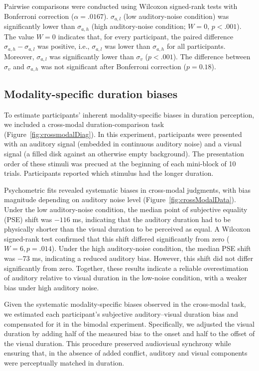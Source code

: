 \documentclass{biorxiv}
\begin{document}
Pairwise comparisons were conducted using Wilcoxon signed-rank tests with Bonferroni correction ($\alpha = .0167$). $\sigma_{a,l}$ (low auditory-noise condition) was significantly lower than $\sigma_{a,h}$ (high auditory-noise condition; $W = 0$, $p < .001$). The value $W = 0$ indicates that, for every participant, the paired difference $\sigma_{a,h} - \sigma_{a,l}$ was positive, i.e., $\sigma_{a,l}$ was lower than $\sigma_{a,h}$ for all participants.  Moreover, $\sigma_{a,l}$ was significantly lower than $\sigma_v$ ($p < .001$). The difference between $\sigma_v$ and $\sigma_{a,h}$ was not significant after Bonferroni correction ($p = 0.18$).

\subsection{Modality-specific duration biases}

To estimate participants' inherent modality-specific biases in duration perception, we included a cross-modal duration-comparison task (Figure~\ref{fig:crossmodalDiag}). In this experiment, participants were presented with an auditory signal (embedded in continuous auditory noise) and a visual signal (a filled disk against an otherwise empty background). The presentation order of these stimuli was precued at the beginning of each mini-block of 10 trials. Participants reported which stimulus had the longer duration.

Psychometric fits revealed systematic biases in cross-modal judgments, with bias magnitude depending on auditory noise level (Figure~\ref{fig:crossModalData}). Under the low auditory-noise condition, the median point of subjective equality (PSE) shift was $-116$ ms, indicating that the auditory duration had to be physically shorter than the visual duration to be perceived as equal. A Wilcoxon signed-rank test confirmed that this shift differed significantly from zero ($W = 6, p = .014$). Under the high auditory-noise condition, the median PSE shift was $-73$ ms, indicating a reduced auditory bias. However, this shift did not differ significantly from zero. Together, these results indicate a reliable overestimation of auditory relative to visual duration in the low-noise condition, with a weaker bias under high auditory noise.

Given the systematic modality-specific biases observed in the cross-modal task, we estimated each participant's subjective auditory--visual duration bias and compensated for it in the bimodal experiment. Specifically, we adjusted the visual duration by adding half of the measured bias to the onset and half to the offset of the visual duration. This procedure preserved audiovisual synchrony while ensuring that, in the absence of added conflict, auditory and visual components were perceptually matched in duration. 
\end{document}
